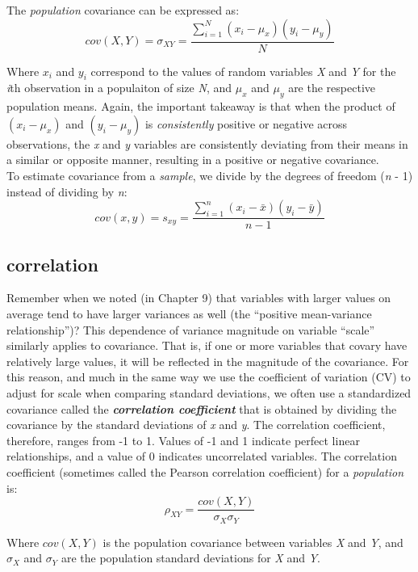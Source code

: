 \documentclass[]{book}
\begin{document}
The \emph{population} covariance can be expressed as:
\[cov(X,Y)=\sigma_{XY}=\frac{\sum_{i=1}^N (x_i-\mu_x)(y_i-\mu_y)}{N}\]

Where \(x_i\) and \(y_i\) correspond to the values of random variables \emph{X} and \emph{Y} for the \emph{i}th observation in a populaiton of size \emph{N}, and \(\mu_x\) and \(\mu_y\) are the respective population means. Again, the important takeaway is that when the product of \((x_i-\mu_x)\) and \((y_i-\mu_y)\) is \emph{consistently} positive or negative across observations, the \emph{x} and \emph{y} variables are consistently deviating from their means in a similar or opposite manner, resulting in a positive or negative covariance.\\

To estimate covariance from a \emph{sample}, we divide by the degrees of freedom (\emph{n} - 1) instead of dividing by \emph{n}:
\[cov(x,y)=s_{xy}=\frac{\sum_{i=1}^n (x_i-\bar{x})(y_i-\bar{y})}{n-1}\]

\hypertarget{correlation}{%
\subsection{correlation}\label{correlation}}

Remember when we noted (in Chapter 9) that variables with larger values on average tend to have larger variances as well (the ``positive mean-variance relationship'')? This dependence of variance magnitude on variable ``scale'' similarly applies to covariance. That is, if one or more variables that covary have relatively large values, it will be reflected in the magnitude of the covariance. For this reason, and much in the same way we use the coefficient of variation (CV) to adjust for scale when comparing standard deviations, we often use a standardized covariance called the \textbf{\emph{correlation coefficient}} that is obtained by dividing the covariance by the standard deviations of \emph{x} and \emph{y}. The correlation coefficient, therefore, ranges from -1 to 1. Values of -1 and 1 indicate perfect linear relationships, and a value of 0 indicates uncorrelated variables. The correlation coefficient (sometimes called the Pearson correlation coefficient) for a \emph{population} is:
\[\rho_{XY}=\frac{cov(X,Y)}{\sigma_X\sigma_Y} \]

Where \(cov(X,Y)\) is the population covariance between variables \emph{X} and \emph{Y}, and \(\sigma_X\) and \(\sigma_Y\) are the population standard deviations for \emph{X} and \emph{Y}.
\end{document}
